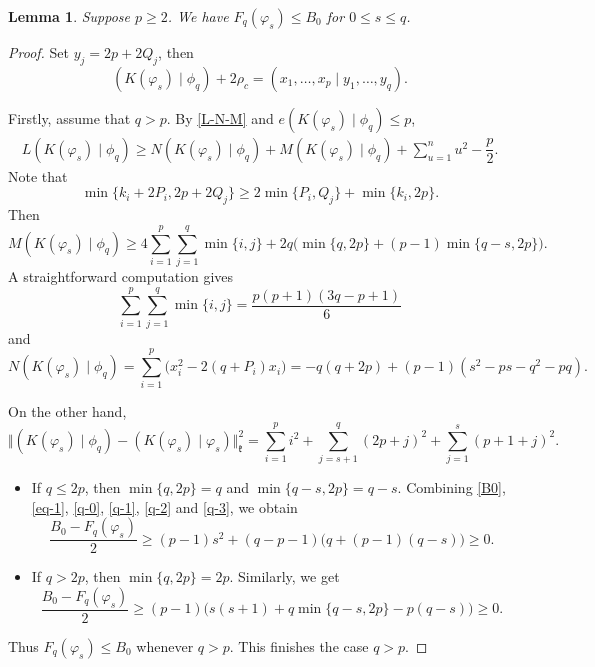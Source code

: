 \documentclass[11pt]{amsart}
\theoremstyle{plain}
\newtheorem{lemma}[thm]{Lemma}
\theoremstyle{definition}
\newcommand{\frk}{\mathfrak{k}}
\begin{document}
\begin{lemma}
Suppose $p\ge 2$. We have $F_q(\varphi_s)\le B_0$ for $0\leq s\leq q$.
\end{lemma}
\begin{proof}
Set $y_j=2p+2Q_j$, then $$(K(\varphi_s)\mid\phi_q)+2\rho_c=(x_1,\dots,x_p\mid y_1,\dots,y_q).$$
	
	Firstly, assume that $q>p$. By \eqref{L-N-M} and $e(K(\varphi_s)\mid\phi_q)\le p$,
	\begin{equation}\label{eq-1}
		\begin{aligned}
			L(K(\varphi_s)\mid\phi_q)\ge N(K(\varphi_s)\mid \phi_q)+M(K(\varphi_s)\mid\phi_q)+\sum_{u=1}^nu^2-\dfrac{p}{2}.
		\end{aligned}
	\end{equation}
		Note that
	\[\min\{k_i+2P_i,2p+2Q_j\}\ge 2\min\{P_i,Q_j\}+\min\{k_i,2p\}.\]
	Then
	\begin{equation}\label{q-0}
		M(K(\varphi_s)\mid\phi_q)\ge4\sum_{i=1}^p\sum_{j=1}^q\min\{i,j\}+2q\big(\min\{q,2p\}+(p-1)\min\{q-s,2p\}\big).
	\end{equation}
	A straightforward computation gives
	\begin{equation}\label{q-1}
		\sum_{i=1}^p\sum_{j=1}^q\min\{i,j\}=\dfrac{p(p+1)(3q-p+1)}{6}
	\end{equation}
	and
	\begin{equation}\label{q-2}
		 N(K(\varphi_s)\mid \phi_q)=\sum_{i=1}^p\big(x_i^2-2(q+P_i)x_i\big)=-q(q+2p)+(p-1)(s^2-ps-q^2-pq).
	\end{equation}
	
		On the other hand,
	\begin{equation}\label{q-3}
		\Vert(K(\varphi_s)\mid\phi_q)-(K(\varphi_s)\mid \varphi_s)\Vert_\frk^2=\sum_{i=1}^pi^2+\sum_{j=s+1}^q(2p+j)^2+\sum_{j=1}^{s}(p+1+j)^2.
	\end{equation}

\begin{itemize}
\item [$\bullet$]	If $q\le 2p$, then $\min\{q,2p\}=q$ and $\min\{q-s,2p\}=q-s$. Combining \eqref{B0}, \eqref{eq-1}, \eqref{q-0}, \eqref{q-1}, \eqref{q-2} and \eqref{q-3}, we obtain
	\[\dfrac{B_0-F_q(\varphi_s)}{2}\ge (p-1)s^2+(q-p-1)\big(q+(p-1)(q-s)\big)\ge 0.\]
\item [$\bullet$]	If  $q>2p$, then $\min\{q,2p\}=2p$. Similarly, we get
	\[\dfrac{B_0-F_q(\varphi_s)}{2}\ge (p-1)\big(s(s+1)+q\min\{q-s,2p\}-p(q-s)\big)\ge 0.\]
\end{itemize}
Thus $F_q(\varphi_s)\le B_0$ whenever $q>p$. This finishes the case $q>p$.


\end{proof}
\end{document}
